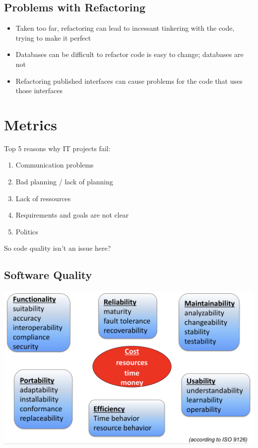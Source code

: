 \documentclass[10pt]{article}
\begin{document}
	\subsection{Problems with Refactoring}
	\begin{itemize}
		\item Taken too far, refactoring can lead to incessant tinkering with the code, trying to make it perfect
		\item Databases can be difficult to refactor code is easy to change; databases are not
		\item Refactoring published interfaces can cause problems for the code that uses those interfaces
	\end{itemize}

	
	\newpage
	
	\section{Metrics}
	Top 5 reasons why IT projects fail:
	\begin{enumerate}
		\item Communication problems
		\item Bad planning / lack of planning
		\item Lack of ressources
		\item Requirements and goals are not clear
		\item Politics
	\end{enumerate}
	So code quality isn’t an issue here?
	\subsection{Software Quality}
	\includegraphics[scale=0.4]{assets/software_quality}
	
\end{document}
